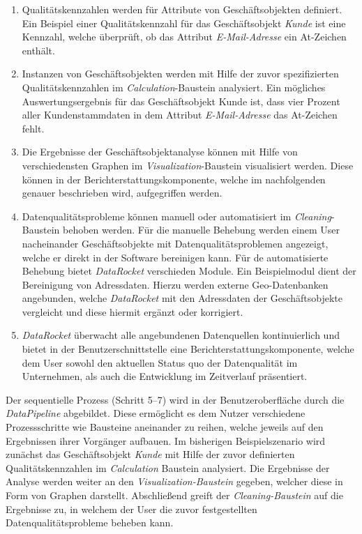 \documentclass[
  language=german, %
  type=bachelor%
]{isthesis}
\begin{document}
\begin{content}
\begin{enumerate}
    \item Qualitätskennzahlen werden für Attribute von Geschäftsobjekten
      definiert. Ein Beispiel einer Qualitätskennzahl für das Geschäftsobjekt
      \textit{Kunde} ist eine Kennzahl, welche überprüft, ob das Attribut
      \textit{E-Mail-Adresse} ein At-Zeichen enthält.

    \item Instanzen von Geschäftsobjekten werden mit Hilfe der zuvor
      spezifizierten Qualitätskennzahlen im \textit{Calculation}-Baustein
      analysiert. Ein mögliches Auswertungsergebnis für das Geschäftsobjekt
      Kunde ist, dass vier Prozent aller Kundenstammdaten in dem Attribut
      \textit{E-Mail-Adresse} das At-Zeichen fehlt.

    \item Die Ergebnisse der Geschäftsobjektanalyse können mit Hilfe von
      verschiedensten Graphen im \textit{Visualization}-Baustein visualisiert
      werden. Diese können in der Berichterstattungskomponente, welche im
      nachfolgenden genauer beschrieben wird, aufgegriffen werden.

    \item Datenqualitätsprobleme können manuell oder automatisiert im
      \textit{Cleaning}-Baustein behoben werden. Für die manuelle Behebung
      werden einem User nacheinander Geschäftsobjekte mit
      Datenqualitätsproblemen angezeigt, welche er direkt in der Software
      bereinigen kann. Für de automatisierte Behebung bietet
      \textit{DataRocket} verschieden Module. Ein Beispielmodul dient der
      Bereinigung von Adressdaten. Hierzu werden externe
      Geo-Datenbanken  angebunden, welche
      \textit{DataRocket} mit den Adressdaten der Geschäftsobjekte vergleicht
      und diese hiermit \ggf{} ergänzt oder korrigiert.

    \item \textit{DataRocket} überwacht alle angebundenen Datenquellen
      kontinuierlich und bietet in der Benutzerschnittstelle eine
      Berichterstattungskomponente, welche dem User sowohl den aktuellen Status
      quo der Datenqualität im Unternehmen, als auch die Entwicklung im
      Zeitverlauf präsentiert.
	\end{enumerate}

    Der sequentielle Prozess (Schritt 5--7) wird in der
    Benutzeroberfläche durch die \textit{DataPipeline}
    abgebildet. Diese ermöglicht es
    dem Nutzer verschiedene Prozessschritte wie Bausteine aneinander zu reihen,
    welche jeweils auf den Ergebnissen ihrer Vorgänger aufbauen. Im bisherigen
    Beispielszenario wird zunächst das Geschäftsobjekt \textit{Kunde} mit Hilfe
    der zuvor definierten Qualitätskennzahlen im \textit{Calculation} Baustein
    analysiert. Die Ergebnisse der Analyse werden weiter an den
    \textit{Visualization-Baustein} gegeben, welcher diese in Form von Graphen
    darstellt. Abschließend greift der \textit{Cleaning-Baustein} auf die
    Ergebnisse zu, in welchem der User die zuvor festgestellten
    Datenqualitätsprobleme beheben kann.


\end{content}
\end{document}
